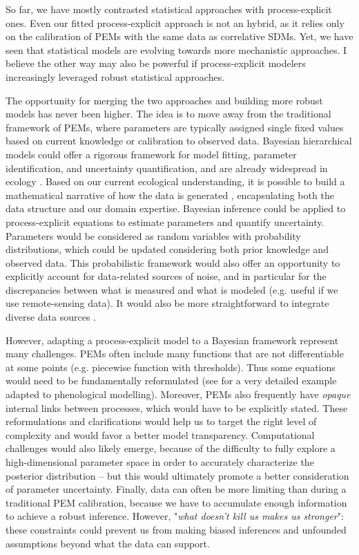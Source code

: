 So far, we have mostly contrasted statistical approaches with process-explicit ones. Even our fitted process-explicit approach is not an hybrid, as it relies only on the calibration of PEMs with the same data as correlative SDMs. Yet, we have seen that statistical models are evolving towards more mechanistic approaches. I believe the other way may also be powerful if process-explicit modelers increasingly leveraged robust statistical approaches. 

The opportunity for merging the two approaches and building more robust models has never been higher. The idea is to move away from the traditional framework of PEMs, where parameters are typically assigned single fixed values based on current knowledge or calibration to observed data. Bayesian hierarchical models could offer a rigorous framework for model fitting, parameter identification, and uncertainty quantification, and are already widespread in ecology \citep{Cressie2009, Zurell2016}. Based on our current ecological understanding, it is possible to build a mathematical narrative of how the data is generated \citep{Betancourt2020}, encapsulating both the data structure and our domain expertise. Bayesian inference could be applied to process-explicit equations to estimate parameters and quantify uncertainty. Parameters would be considered as random variables with probability distributions, which could be updated considering both prior knowledge and observed data. This probabilistic framework would also offer an opportunity to explicitly account for data-related sources of noise, and in particular for the discrepancies between what is measured and what is modeled (e.g. useful if we use remote-sensing data). 
It would also be more straightforward to integrate diverse data sources \citep{Cailleret2020, Cameron2022}. 

However, adapting a process-explicit model to a Bayesian framework represent many challenges. PEMs often include many functions that are not differentiable at some points (e.g. piecewise function with thresholds). Thus some equations would need to be fundamentally reformulated (see \citet{Betancourt2022} for a very detailed example adapted to phenological modelling). Moreover, PEMs also frequently have \emph{opaque} internal links between processes, which would have to be explicitly stated. These reformulations and clarifications would help us to target the right level of complexity and would favor a better model transparency. 
Computational challenges would also likely emerge, because of the difficulty to fully explore a high-dimensional parameter space in order to accurately characterize the posterior distribution -- but this would ultimately promote a better consideration of parameter uncertainty. Finally, data can often be more limiting than during a traditional PEM calibration, because we have to accumulate enough information to achieve a robust inference. However, "\emph{what doesn't kill us makes us stronger}": these constraints could prevent us from making biased inferences and unfounded assumptions beyond what the data can support.

